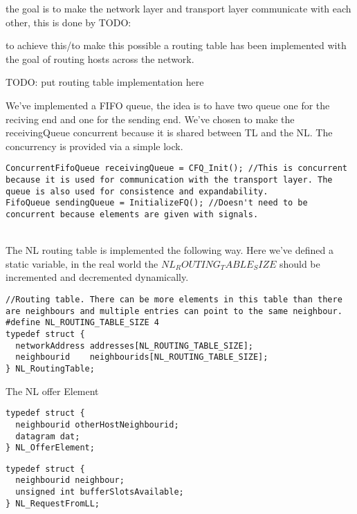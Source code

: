 the goal is to make the network layer and transport layer communicate with each other, this is done by TODO:


to achieve this/to make this possible a routing table has been implemented with the goal of routing hosts across the network.

TODO: put routing table implementation here

We've implemented a FIFO queue, the idea is to have two queue one for the reciving end and one for the sending end.
We've chosen to make the receivingQueue concurrent because it is shared between TL and the NL.
The concurrency is provided via a simple lock.

\begin{lstlisting}
ConcurrentFifoQueue receivingQueue = CFQ_Init(); //This is concurrent because it is used for communication with the transport layer. The queue is also used for consistence and expandability.
FifoQueue sendingQueue = InitializeFQ(); //Doesn't need to be concurrent because elements are given with signals.
\end{lstlisting}

\\




The NL routing table is implemented the following way.
Here we've defined a static variable, in the real world the $NL_ROUTING_TABLE_SIZE$ should be incremented and decremented dynamically.
\begin{lstlisting}
//Routing table. There can be more elements in this table than there are neighbours and multiple entries can point to the same neighbour.
#define NL_ROUTING_TABLE_SIZE 4
typedef struct {
  networkAddress addresses[NL_ROUTING_TABLE_SIZE];
  neighbourid    neighbourids[NL_ROUTING_TABLE_SIZE];
} NL_RoutingTable;
\end{lstlisting}

\break


The NL offer Element
\begin{lstlisting}
typedef struct {
  neighbourid otherHostNeighbourid;
  datagram dat;
} NL_OfferElement;
\end{lstlisting}

\break

\begin{lstlisting}
typedef struct {
  neighbourid neighbour;
  unsigned int bufferSlotsAvailable;
} NL_RequestFromLL;

\end{lstlisting}



